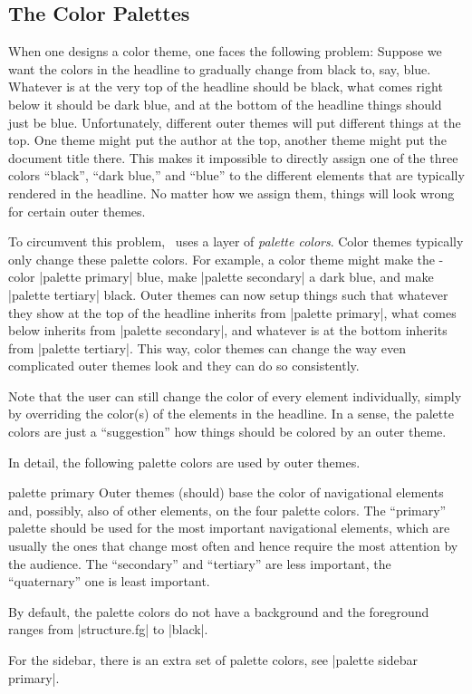 \subsection{The Color Palettes}

When one designs a color theme, one faces the following problem:
Suppose we want the colors in the headline to gradually change from
black to, say, blue. Whatever is at the very top of the headline
should be black, what comes right below it should be dark blue, and at
the bottom of the headline things should just be blue. Unfortunately,
different outer themes will put different things at the top. One theme
might put the author at the top, another theme might put the document
title there. This makes it impossible to directly assign one of the
three colors ``black'', ``dark blue,'' and ``blue'' to the different
elements that are typically rendered in the headline. No matter how we
assign them, things will look wrong for certain outer themes.

To circumvent this problem, \beamer\ uses a layer of \emph{palette
colors}. Color themes typically only change these palette colors. For
example, a color theme might make the \beamer-color |palette primary|
blue, make |palette secondary| a dark blue, and make |palette tertiary|
black. Outer themes can now setup things such that whatever they show
at the top of the headline inherits from |palette primary|, what comes
below inherits from |palette secondary|, and whatever is at the bottom
inherits from |palette tertiary|. This way, color themes can change the
way even complicated outer themes look and they can do so
consistently.

Note that the user can still change the color of every element
individually, simply by overriding the color(s) of the elements in the
headline. In a sense, the palette colors are just a ``suggestion'' how
things should be colored by an outer theme.

In detail, the following palette colors are used by outer themes.


\begin{element}{palette primary}\no\yes\no
  Outer themes (should) base the color of navigational elements and,
  possibly, also of other elements, on the four palette colors. The
  ``primary'' palette should be used for the most important
  navigational elements, which are usually the ones that change most
  often and hence require the most attention by the audience. The
  ``secondary'' and ``tertiary'' are less important, the ``quaternary'' one
  is least important.

  By default, the palette colors do not have a background and the
  foreground ranges from |structure.fg| to |black|.

  For the sidebar, there is an extra set of palette colors, see
  |palette sidebar primary|.
\end{element}

